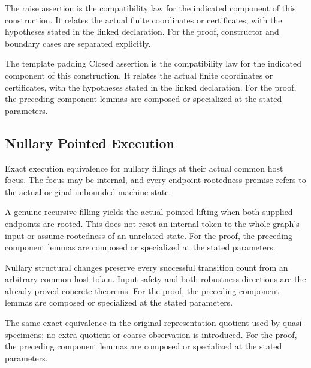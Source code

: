 The raise assertion is the compatibility law for the indicated component of this construction. It relates the actual finite coordinates or certificates, with the hypotheses stated in the linked declaration.
For the proof, constructor and boundary cases are separated explicitly.
\par{}

The template padding Closed assertion is the compatibility law for the indicated component of this construction. It relates the actual finite coordinates or certificates, with the hypotheses stated in the linked declaration.
For the proof, the preceding component lemmas are composed or specialized at the stated parameters.
\par{}

\subsection{Nullary Pointed Execution}
Exact execution equivalence for nullary fillings at their actual common host focus. The focus may be internal, and every endpoint rootedness premise refers to the actual original unbounded machine state.

A genuine recursive filling yields the actual pointed lifting when both supplied endpoints are rooted. This does not reset an internal token to the whole graph's input or assume rootedness of an unrelated state.
For the proof, the preceding component lemmas are composed or specialized at the stated parameters.
\par{}

Nullary structural changes preserve every successful transition count from an arbitrary common host token. Input safety and both robustness directions are the already proved concrete theorems.
For the proof, the preceding component lemmas are composed or specialized at the stated parameters.
\par{}

The same exact equivalence in the original representation quotient used by quasi-specimens; no extra quotient or coarse observation is introduced.
For the proof, the preceding component lemmas are composed or specialized at the stated parameters.
\par{}

